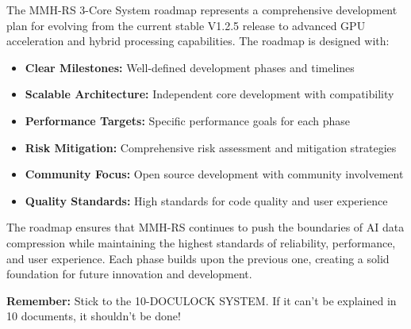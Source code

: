 \documentclass[12pt,a4paper]{article}
\begin{document}
The MMH-RS 3-Core System roadmap represents a comprehensive development plan for evolving from the current stable V1.2.5 release to advanced GPU acceleration and hybrid processing capabilities. The roadmap is designed with:

\begin{itemize}
    \item \textbf{Clear Milestones:} Well-defined development phases and timelines
    \item \textbf{Scalable Architecture:} Independent core development with compatibility
    \item \textbf{Performance Targets:} Specific performance goals for each phase
    \item \textbf{Risk Mitigation:} Comprehensive risk assessment and mitigation strategies
    \item \textbf{Community Focus:} Open source development with community involvement
    \item \textbf{Quality Standards:} High standards for code quality and user experience
\end{itemize}

The roadmap ensures that MMH-RS continues to push the boundaries of AI data compression while maintaining the highest standards of reliability, performance, and user experience. Each phase builds upon the previous one, creating a solid foundation for future innovation and development.

\textbf{Remember:} Stick to the 10-DOCULOCK SYSTEM. If it can't be explained in 10 documents, it shouldn't be done!
\end{document}
